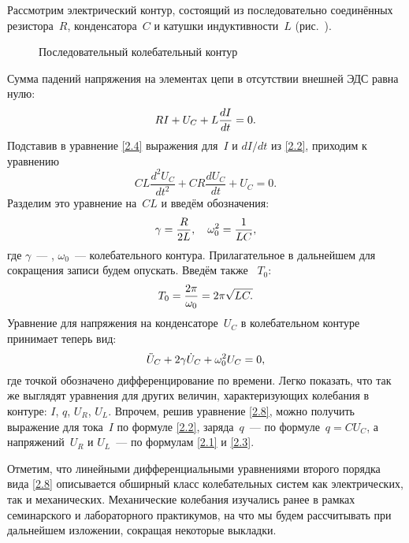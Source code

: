 \label{sec:free}

Рассмотрим электрический контур, состоящий из последовательно соединённых
резистора~$R$, конденсатора~$C$ и катушки индуктивности~$L$
(рис.~).

\begin{figure}[h!]
	\centering
	\caption{Последовательный колебательный контур}
\end{figure}

Сумма падений напряжения на элементах цепи в отсутствии внешней ЭДС равна нулю:
\begin{equation}
	\eqmark{2.4}
	RI+U_C+L\dfrac{dI}{dt}=0.
\end{equation}
Подставив в уравнение \eqref{2.4} выражения для~$I$ и $dI/dt$ из \eqref{2.2},
приходим к уравнению
\begin{equation*}
	CL\dfrac{d^2 U_{C} }{dt^2}+CR\dfrac{dU_C}{dt}+U_C=0.
\end{equation*}
Разделим это уравнение на~$CL$ и введём обозначения:
\begin{equation}\eqmark{2.6}
\gamma=\dfrac{R}{2L},~~~\omega_0^2=\dfrac{1}{LC},
\end{equation}
где $\gamma$~--- ,
$\omega_0$~---  колебательного контура.
Прилагательное   в дальнейшем для сокращения записи будем 
опускать. Введём также  ~$T_0$:
\begin{equation}\eqmark{2.7}
T_0=\dfrac{2\pi}{\omega_0}=2\pi\sqrt{LC.}
\end{equation}
Уравнение для напряжения на конденсаторе~$U_C$ в колебательном контуре 
принимает теперь вид:
\begin{equation}\eqmark{2.8}
\ddot{U}_C+2\gamma\dot{U}_C+\omega_0^2U_C=0,
\end{equation}
где точкой обозначено дифференцирование по времени. Легко показать, что так же
выглядят уравнения для других величин, характеризующих колебания в контуре:
$I$, $q$, $U_R$, $U_L$.
Впрочем, решив уравнение \eqref{2.8}, можно получить выражение для тока~$I$ по
формуле \eqref{2.2}, заряда~$q$~--- по формуле~$q=CU_C$, а напряжений~$U_R$ и
$U_L$~--- по формулам \eqref{2.1} и \eqref{2.3}.

Отметим, что линейными дифференциальными уравнениями второго порядка вида
\eqref{2.8} описывается обширный класс колебательных систем как электрических,
так и механических. Механические колебания изучались ранее в рамках
семинарского и лабораторного практикумов, на что мы будем рассчитывать при
дальнейшем изложении, сокращая некоторые выкладки.

